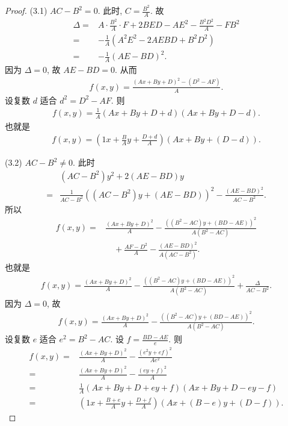 \documentclass[%
    UTF8,%
    fontset=none,%
    punct=kaiming,%
    zihao=-4,%
    a4paper,%
    oneside,%
]{ctexbook}
\begin{document}
\begin{proof}
    (3.1)
    \(AC - B^2 = 0\).
    此时, \(C = \frac{B^2}{A}\).
    故
    \begin{align*}
        \Delta
        = {} & A \cdot \frac{B^2}{A} \cdot F + 2BED - AE^2
        - \frac{B^2 D^2}{A} - FB^2                         \\
        = {} & {-\frac{1}{A}}
        (A^2 E^2 - 2AE BD + B^2 D^2)                       \\
        = {} & {-\frac{1}{A}} (AE - BD)^2.
    \end{align*}
    因为 \(\Delta = 0\),
    故 \(AE - BD = 0\).
    从而
    \begin{align*}
        f(x, y) = \frac{(Ax + By + D)^2 - (D^2 - AF)}{A}.
    \end{align*}
    设复数 \(d\) 适合 \(d^2 = D^2 - AF\).
    则
    \begin{align*}
        f(x, y) = \frac{1}{A} (Ax + By + D + d)(Ax + By + D - d).
    \end{align*}
    也就是
    \begin{align*}
        f(x, y) = \left( 1x + \frac{B}{A} y + \frac{D+d}{A} \right) (Ax + By + (D - d)).
    \end{align*}

    (3.2)
    \(AC - B^2 \neq 0\).
    此时
    \begin{align*}
             & (AC - B^2) y^2 + 2(AE - BD)y
        \\
        = {} & \frac{1}{AC - B^2} ((AC - B^2)y + (AE - BD))^2 - \frac{(AE - BD)^2}{AC - B^2}.
    \end{align*}
    所以
    \begin{align*}
        f(x, y)
        = {} & \frac{(Ax + By + D)^2}{A} - \frac{((B^2 - AC)y + (BD - AE))^2}{A(B^2 - AC)}
        \\
             & \quad
        + \frac{AF - D^2}{A} - \frac{(AE - BD)^2}{A(AC - B^2)}.
    \end{align*}
    也就是
    \begin{align*}
        f(x, y) = \frac{(Ax + By + D)^2}{A} - \frac{((B^2 - AC)y + (BD - AE))^2}{A(B^2 - AC)} + \frac{\Delta}{AC - B^2}.
    \end{align*}
    因为 \(\Delta = 0\), 故
    \begin{align*}
        f(x, y) = \frac{(Ax + By + D)^2}{A} - \frac{((B^2 - AC)y + (BD - AE))^2}{A(B^2 - AC)}.
    \end{align*}
    设复数 \(e\) 适合 \(e^2 = B^2 - AC\).
    设 \(f = \frac{BD-AE}{e}\).
    则
    \begin{align*}
        f(x, y)
        = {} & \frac{(Ax + By + D)^2}{A} - \frac{(e^2 y + ef)^2}{Ae^2}                   \\
        = {} & \frac{(Ax + By + D)^2}{A} - \frac{(ey + f)^2}{A}                          \\
        = {} & \frac{1}{A}(Ax + By + D + ey + f)(Ax + By + D - ey - f)                   \\
        = {} & \left( 1x + \frac{B+e}{A}y + \frac{D+f}{A} \right) (Ax + (B-e)y + (D-f)).
    \end{align*}


\end{proof}
\end{document}
